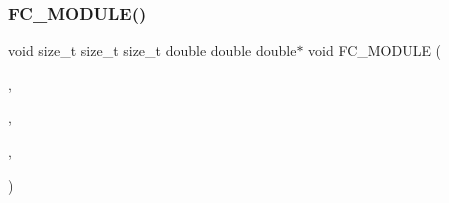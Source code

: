 \hypertarget{GridKernels_8H_a81014fabdd26df2572b014cef7635cce}{}\label{GridKernels_8H_a81014fabdd26df2572b014cef7635cce} 
\subsubsection{\texorpdfstring{F\+C\+\_\+\+M\+O\+D\+U\+L\+E()}{FC\_MODULE()}\hspace{0.1cm}{\footnotesize\ttfamily [2/2]}}
{\footnotesize\ttfamily void size\+\_\+t size\+\_\+t size\+\_\+t double double double$\ast$ void F\+C\+\_\+\+M\+O\+D\+U\+LE (\begin{DoxyParamCaption}\item[{grid}]{,  }\item[{applycartesiangridmetric}]{,  }\item[{G\+R\+ID}]{,  }\item[{A\+P\+P\+L\+Y\+C\+A\+R\+T\+E\+S\+I\+A\+N\+G\+R\+I\+D\+M\+E\+T\+R\+IC}]{ }\end{DoxyParamCaption})}

